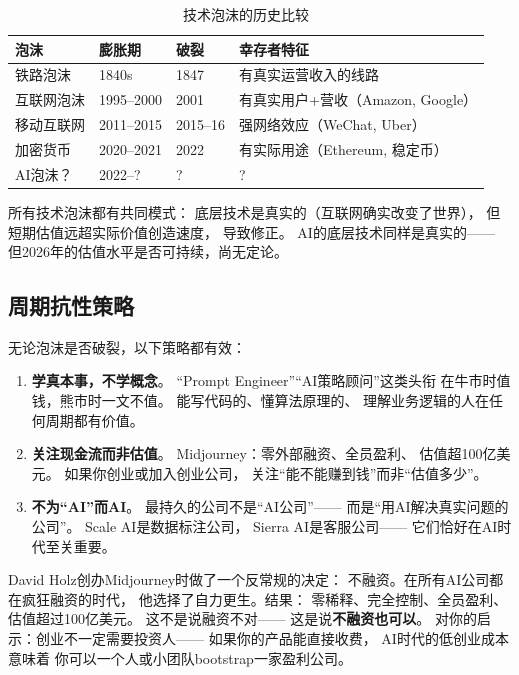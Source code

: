\begin{table}[htbp]
\centering
\caption{技术泡沫的历史比较}
\label{tab:bubble-comparison}
\small
\begin{tabularx}{\textwidth}{l l l X}
\toprule
\rowcolor{figLightGray}
\textbf{泡沫} & \textbf{膨胀期} & \textbf{破裂} & \textbf{幸存者特征} \\
\midrule
铁路泡沫 & 1840s & 1847 & 有真实运营收入的线路 \\
互联网泡沫 & 1995--2000 & 2001 & 有真实用户+营收（Amazon, Google） \\
移动互联网 & 2011--2015 & 2015--16 & 强网络效应（WeChat, Uber） \\
加密货币 & 2020--2021 & 2022 & 有实际用途（Ethereum, 稳定币） \\
AI泡沫？ & 2022--? & ? & ? \\
\bottomrule
\end{tabularx}
\end{table}

所有技术泡沫都有共同模式：
底层技术是真实的（互联网确实改变了世界），
但短期估值远超实际价值创造速度，
导致修正。
AI的底层技术同样是真实的——
但2026年的估值水平是否可持续，尚无定论。

\subsection{周期抗性策略}

无论泡沫是否破裂，以下策略都有效：

\begin{enumerate}
  \item \textbf{学真本事，不学概念}。
    ``Prompt Engineer''``AI策略顾问''这类头衔
    在牛市时值钱，熊市时一文不值。
    能写代码的、懂算法原理的、
    理解业务逻辑的人在任何周期都有价值。
  \item \textbf{关注现金流而非估值}。
    Midjourney：零外部融资、全员盈利、
    估值超100亿美元。
    如果你创业或加入创业公司，
    关注``能不能赚到钱''而非``估值多少''。
  \item \textbf{不为``AI''而AI}。
    最持久的公司不是``AI公司''——
    而是``用AI解决真实问题的公司''。
    Scale AI是数据标注公司，
    Sierra AI是客服公司——
    它们恰好在AI时代至关重要。
\end{enumerate}

\begin{whybox}[Midjourney模式的启示]
David Holz创办Midjourney时做了一个反常规的决定：
不融资。在所有AI公司都在疯狂融资的时代，
他选择了自力更生。结果：
零稀释、完全控制、全员盈利、
估值超过100亿美元。
这不是说融资不对——
这是说\textbf{不融资也可以}。
对你的启示：创业不一定需要投资人——
如果你的产品能直接收费，
AI时代的低创业成本意味着
你可以一个人或小团队bootstrap一家盈利公司。
\end{whybox}



